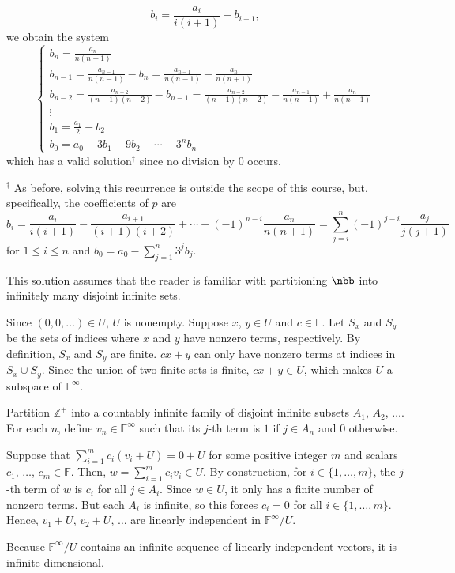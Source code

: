 \begin{coole}
\[    	b_i = \frac{a_i}{i(i+1)} - b_{i+1},
    \]
    we obtain the system
    \[
        \begin{cases}
            b_n = \frac{a_n}{n(n+1)} \\
            b_{n-1} = \frac{a_{n-1}}{n(n-1)} - b_n = \frac{a_{n-1}}{n(n-1)} - \frac{a_n}{n(n+1)} \\
            b_{n-2} = \frac{a_{n-2}}{(n-1)(n-2)} - b_{n-1} = \frac{a_{n-2}}{(n-1)(n-2)} - \frac{a_{n-1}}{n(n-1)} + \frac{a_n}{n(n+1)} \\
            \vdots \\
            b_1 = \frac{a_1}{2} - b_2 \\
            b_0 = a_0 - 3b_1 - 9b_2 - \cdots - 3^nb_n
        \end{cases}
    \]
    which has a valid solution$^\dagger$ since no division by $0$ occurs.
\end{coole}

$^\dagger$ As before, solving this recurrence is outside the scope of this course, but, specifically, the coefficients of $p$ are
\[
	b_i = \frac{a_i}{i(i+1)} - \frac{a_{i+1}}{(i+1)(i+2)} + \cdots + (-1)^{n-i}\frac{a_n}{n(n+1)} = \sum_{j=i}^n(-1)^{j-i}\frac{a_j}{j(j+1)}
\]
for $1 \leq i \leq n$ and $b_0 = a_0 - \sum_{j=1}^n3^jb_j$.


\begin{csp}
    This solution assumes that the reader is familiar with partitioning $\nbb$ into infinitely many disjoint infinite sets.
    \begin{subexercises}
        \item Since $(0,0,\dots) \in U$, $U$ is nonempty.
        Suppose $x$, $y \in U$ and $c \in \mathbb{F}$.
        Let $S_x$ and $S_y$ be the sets of indices where $x$ and $y$ have nonzero terms, respectively.
        By definition, $S_x$ and $S_y$ are finite. $cx+y$ can only have nonzero terms at indices in $S_x \cup S_y$.
        Since the union of two finite sets is finite, $cx+y \in U$, which makes $U$ a subspace of $\mathbb{F}^{\infty}$. 

        \item Partition $\mathbb{Z}^{+}$ into a countably infinite family of disjoint infinite subsets $A_1$, $A_2$, $\dots$.
	    For each $n$, define $v_n \in \mathbb{F}^{\infty}$ such that its $j$-th term is $1$ if $j \in A_n$ and $0$ otherwise.

        Suppose that $\sum^{m}_{i=1} c_i (v_i+U)=0+U$ for some positive integer $m$ and scalars $c_1$, $\dots$, $c_m \in \mathbb{F}$.
	    Then, $w=\sum^{m}_{i=1} c_i v_i \in U$.
	    By construction, for $i \in \{1, \dots, m\}$, the $j$-th term of $w$ is $c_i$ for all $j \in A_i$.
	    Since $w \in U$, it only has a finite number of nonzero terms.
	    But each $A_i$ is infinite, so this forces $c_i=0$ for all $i \in \{1, \dots, m\}$.
	    Hence, $v_1+U$, $v_2+U$, $\dots$ are linearly independent in $\mathbb{F}^{\infty}/U$.

        Because $\mathbb{F}^{\infty}/U$ contains an infinite sequence of linearly independent vectors, it is infinite-dimensional. \qedhere
    \end{subexercises}
\end{csp}

